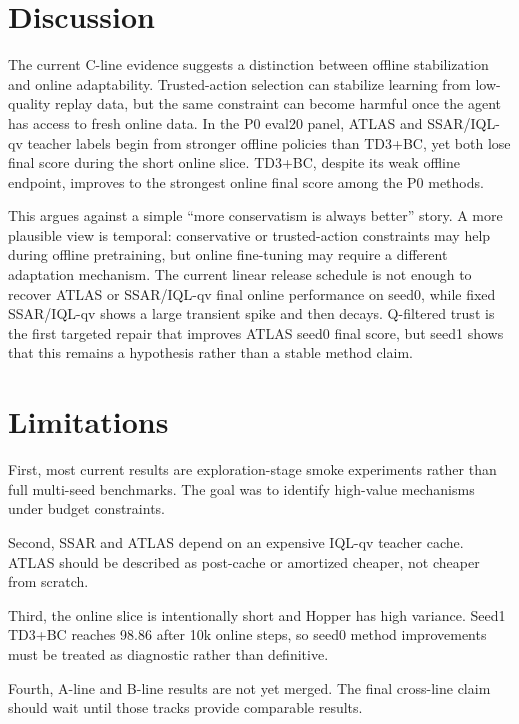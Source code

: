 \section{Discussion}

The current C-line evidence suggests a distinction between offline stabilization and online adaptability. Trusted-action selection can stabilize learning from low-quality replay data, but the same constraint can become harmful once the agent has access to fresh online data. In the P0 eval20 panel, ATLAS and SSAR/IQL-qv teacher labels begin from stronger offline policies than TD3+BC, yet both lose final score during the short online slice. TD3+BC, despite its weak offline endpoint, improves to the strongest online final score among the P0 methods.

This argues against a simple ``more conservatism is always better'' story. A more plausible view is temporal: conservative or trusted-action constraints may help during offline pretraining, but online fine-tuning may require a different adaptation mechanism. The current linear release schedule is not enough to recover ATLAS or SSAR/IQL-qv final online performance on seed0, while fixed SSAR/IQL-qv shows a large transient spike and then decays. Q-filtered trust is the first targeted repair that improves ATLAS seed0 final score, but seed1 shows that this remains a hypothesis rather than a stable method claim.


\section{Limitations}

First, most current results are exploration-stage smoke experiments rather than full multi-seed benchmarks. The goal was to identify high-value mechanisms under budget constraints.

Second, SSAR and ATLAS depend on an expensive IQL-qv teacher cache. ATLAS should be described as post-cache or amortized cheaper, not cheaper from scratch.

Third, the online slice is intentionally short and Hopper has high variance. Seed1 TD3+BC reaches 98.86 after 10k online steps, so seed0 method improvements must be treated as diagnostic rather than definitive.

Fourth, A-line and B-line results are not yet merged. The final cross-line claim should wait until those tracks provide comparable results.
